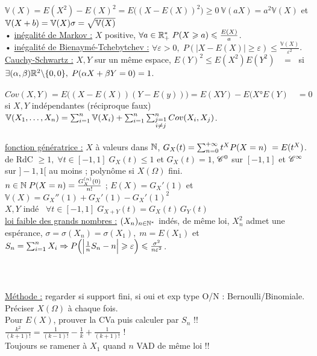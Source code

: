 \documentclass[12 pt]{book}
\begin{document}
$\mathbb{V}(X)=E(X^2)-E(X)^2 = E\big((X-E(X))^2\big)\geqslant 0 \ \mathbb{V}(aX) = a^2 \mathbb{V}(X)$ et $\mathbb{V}(X+b)=\mathbb{V}(X) \\ \sigma = \sqrt{\mathbb{V}(X)}$\\
• \underline{inégalité de Markov :} $X$ positive, $\forall a\in\mathbb{R}_+^* \; P(X\geqslant a)\leqslant \frac{E(X)}{a}$.\\
• \underline{inégalité de Bienaymé-Tchebytchev :} $\forall \varepsilon>0, \; P(|X-E(X)|\geqslant \varepsilon) \leqslant \frac{\mathbb{V}(X)}{\varepsilon^2}$.\newpage
\text{}\\
\underline{Cauchy-Schwartz :} $X,Y$ sur un même espace, $E(Y)^2\leqslant E(X^2)E(Y^2)$ \ $=\;$ si $\exists (\alpha,\beta)\mathbb{R}^2\backslash\{0,0\}, \; P(\alpha X+\beta Y =0) = 1$.\\
\text{}\\
$Cov(X,Y) = E\big((X-E(X))(Y-E(y))\big) = E(XY) - E(X°E(Y) \quad =0$ si $X,Y$ indépendantes (réciproque faux)\\
$\mathbb{V}(X_1,\dots,X_n) = \sum_{i=1}^n \mathbb{V}(X_i) + \sum_{i=1}^n \sum_{\substack{j=1\\i\neq j}}^n Cov(X_i,X_j)$.\\
\text{}\\
\underline{fonction génératrice :} $X$ à valeurs dans $\mathbb{N}$, $G_X(t) = \sum_{n=0}^{+\infty} t^X P(X=n) \ =E(t^X)$.\\
de RdC $\geqslant 1, \; \forall t\in [-1,1] \; G_X(t)\leqslant 1$ et $G_X(t) =1$, $\mathscr{C}^0$ sur $[-1,1]$ et $\mathscr{C}^\infty$ sur $]-1,1[$ au moins ; polynôme si $X(\Omega)$ fini.\\
$n\in \mathbb{N} \; P(X=n) = \frac{G_X^{(n)}(0)}{n!}$ ; $E(X) = G_X'(1)$ et $\mathbb{V}(X) = G_X''(1) + G_X'(1)-G_X'(1)^2$\\
$X,Y$ indé \ $\forall t\in [-1,1]\; G_{X+Y}(t) = G_X(t)\, G_Y(t)$\\
\underline{loi faible des grands nombres :} $(X_n)_{n\in\mathbb{N}^*}$ indés, de même loi, $X_n^2$ admet une espérance, $\sigma=\sigma(X_n)=\sigma(X_1),\; m=E(X_1)$ et $S_n = \sum_{i=1}^n X_i \Rightarrow P\Big(\Big| \frac{1}{n}S_n -n\Big| \geqslant\varepsilon\Big) \leqslant \frac{\sigma^2}{n\varepsilon^2}$.\\
\text{}\\
\text{}\\
\text{}\\
\underline{Méthode :} regarder si support fini, si oui et exp type O/N : Bernoulli/Binomiale.\\
Préciser $X(\Omega)$ à chaque fois.\\
Pour $E(X)$, prouver la CVa puis calculer par $S_n$ !!\\
$\frac{k^2}{(k+1)!} = \frac{1}{(k-1)!} - \frac{1}{k} +\frac{1}{(k+1)!}$ \quad !\\
Toujours se ramener à $X_1$ quand $n$ VAD de même loi !!\\
\end{document}
